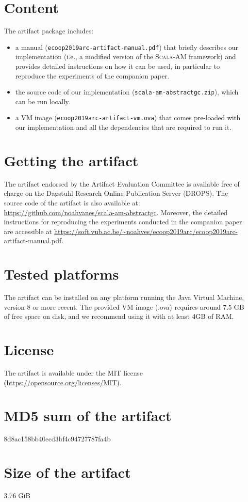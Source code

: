 \documentclass[a4paper,UKenglish]{darts-v2019}
\newenvironment{content}{\section{Content}}{}
\newenvironment{getting}{\section{Getting the artifact} The artifact 
endorsed by the Artifact Evaluation Committee is available free of 
charge on the Dagstuhl Research Online Publication Server (DROPS).}{}
\newenvironment{platforms}{\section{Tested platforms}}{}
\newcommand{\license}[1]{{\section{License}#1}}
\newcommand{\mdsum}[1]{{\section{MD5 sum of the artifact}#1}}
\newcommand{\artifactsize}[1]{{\section{Size of the artifact}#1}}
\begin{document}
\begin{content}
The artifact package includes:
\begin{itemize}
\item a manual (\texttt{ecoop2019arc-artifact-manual.pdf}) that briefly describes our implementation  (i.e., a modified version of the \textsc{Scala-AM} framework) and provides detailed instructions on how it can be used, in particular to reproduce the experiments of the companion paper.
\item the source code of our implementation (\texttt{scala-am-abstractgc.zip}), which can be run locally.
\item a VM image (\texttt{ecoop2019arc-artifact-vm.ova}) that comes pre-loaded with our implementation and all the dependencies that are required to run it.

\end{itemize}
\end{content}

\begin{getting}
The source code of the artifact is also available at:
\url{https://github.com/noahvanes/scala-am-abstractgc}.
Moreover, the detailed instructions for reproducing the experiments conducted in the companion paper are accessible at
\url{https://soft.vub.ac.be/~noahves/ecoop2019arc/ecoop2019arc-artifact-manual.pdf}.
\end{getting}

\begin{platforms}
The artifact can be installed on any platform running the Java Virtual Machine, version 8 or more recent. 
The provided VM image (.ova) requires around 7.5 GB of free space on disk, and we recommend using it with at least 4GB of RAM.
\end{platforms}

\license{The artifact is available under the MIT license (\url{https://opensource.org/licenses/MIT}).}

\mdsum{8d8ac158bb40ecd3bf4c94727787fa4b}

\artifactsize{3.76 GiB}


\end{document}
